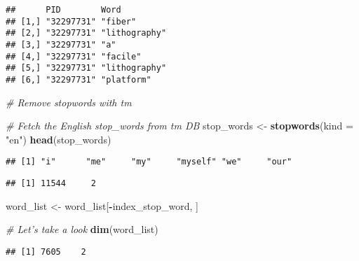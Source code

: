 \documentclass[
  a4paper]{article}
\newenvironment{Shaded}{\begin{snugshade}}{\end{snugshade}}
\newcommand{\CommentTok}[1]{\textcolor[rgb]{0.56,0.35,0.01}{\textit{#1}}}
\newcommand{\DataTypeTok}[1]{\textcolor[rgb]{0.13,0.29,0.53}{#1}}
\newcommand{\DecValTok}[1]{\textcolor[rgb]{0.00,0.00,0.81}{#1}}
\newcommand{\KeywordTok}[1]{\textcolor[rgb]{0.13,0.29,0.53}{\textbf{#1}}}
\newcommand{\NormalTok}[1]{#1}
\newcommand{\OperatorTok}[1]{\textcolor[rgb]{0.81,0.36,0.00}{\textbf{#1}}}
\newcommand{\StringTok}[1]{\textcolor[rgb]{0.31,0.60,0.02}{#1}}
\begin{document}
\begin{verbatim}
##      PID        Word         
## [1,] "32297731" "fiber"      
## [2,] "32297731" "lithography"
## [3,] "32297731" "a"          
## [4,] "32297731" "facile"     
## [5,] "32297731" "lithography"
## [6,] "32297731" "platform"
\end{verbatim}

\begin{Shaded}
\begin{Highlighting}[]
\CommentTok{# Remove stopwords with tm}

\CommentTok{# Fetch the English stop_words from tm DB}
\NormalTok{stop_words <-}\StringTok{ }\KeywordTok{stopwords}\NormalTok{(}\DataTypeTok{kind =} \StringTok{"en"}\NormalTok{)}
\KeywordTok{head}\NormalTok{(stop_words)}
\end{Highlighting}
\end{Shaded}

\begin{verbatim}
## [1] "i"      "me"     "my"     "myself" "we"     "our"
\end{verbatim}

\begin{Shaded}
\end{Shaded}

\begin{verbatim}
## [1] 11544     2
\end{verbatim}

\begin{Shaded}
\begin{Highlighting}[]
\NormalTok{word_list <-}\StringTok{ }\NormalTok{word_list[}\OperatorTok{-}\NormalTok{index_stop_word, ]}

\CommentTok{# Let's take a look}
\KeywordTok{dim}\NormalTok{(word_list)}
\end{Highlighting}
\end{Shaded}

\begin{verbatim}
## [1] 7605    2
\end{verbatim}
\end{document}
